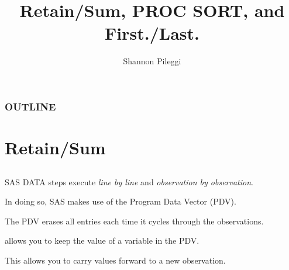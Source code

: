 





\title[Lecture 14]{Retain/Sum, PROC SORT, and First./Last.}
\author[Pileggi]{Shannon Pileggi}


\date{}




\begin{frame}
\titlepage
\end{frame}

\begin{frame}
\frametitle{OUTLINE\qquad\qquad\qquad} \tableofcontents[hideallsubsections]
\end{frame}

\section[Retain/Sum]{Retain/Sum}
\subsection{}


\begin{frame}
\bi
\item SAS DATA steps execute \emph{line by line} and \emph{observation by observation}.
\item In doing so, SAS makes use of the Program Data Vector (PDV).
\item The PDV erases all entries each time it cycles through the observations.
\item {} allows you to keep the value of a variable in the PDV.
\item This allows you to carry values forward to a new observation.
\ei
\end{frame}

